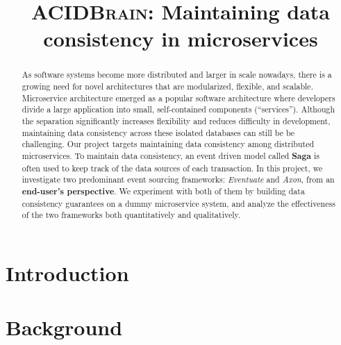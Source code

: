 \documentclass[11pt,onecolumn]{assets/IEEEtran}
\begin{document}
\title{\textsc{ACIDBrain}: Maintaining data consistency in microservices}

\author{

}

\maketitle


\begin{abstract}
    As software systems become more distributed and larger in scale nowadays, there is a growing need for novel architectures that are modularized, flexible, and scalable. Microservice architecture emerged as a popular software architecture where developers divide a large application into small, self-contained components (“services”). Although the separation significantly increases flexibility and reduces difficulty in development, maintaining data consistency across these isolated databases can still be be challenging. Our project targets maintaining data consistency among distributed microservices. To maintain data consistency, an event driven model called \textbf{Saga}\cite{garcia1987sagas} is often used to keep track of the data sources of each transaction. In this project, we investigate two predominant event sourcing frameworks: \textit{Eventuate} and \textit{Axon}, from an \textbf{end-user’s perspective}. We experiment with both of them by building data consistency guarantees on a dummy microservice system, and analyze the effectiveness of the two frameworks both quantitatively and qualitatively.
\end{abstract}



\section{Introduction}


\section{Background}

\end{document}

